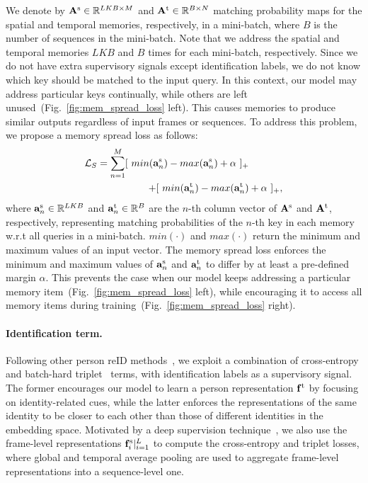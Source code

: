 \documentclass[10pt,twocolumn,letterpaper]{article}
\begin{document}
			We denote by $\mathbf{A}^{\text s} \in \mathbb{R}^{LKB \times M}$ and $\mathbf{A}^{\text t} \in \mathbb{R}^{B \times N}$ matching probability maps for the spatial and temporal memories, respectively, in a mini-batch, where $B$ is the number of sequences in the mini-batch. Note that we address the spatial and temporal memories $LKB$ and $B$ times for each mini-batch, respectively. Since we do not have extra supervisory signals except identification labels, we do not know which key should be matched to the input query. In this context, our model may address particular keys continually, while others are left unused~(Fig.~\ref{fig:mem_spread_loss} left). This causes memories to produce similar outputs regardless of input frames or sequences. To address this problem, we propose a memory spread loss as follows:
					\begin{equation} \label{eq:l_s}
						\begin{split}
							\mathcal{L}_{S} = \sum_{n=1}^{M} 
								[~ min (\mathbf{a}^{\text s}_n) 
								 - max (\mathbf{a}^{\text s}_n) + \alpha~]_+& \\
								+ [~ min (\mathbf{a}^{\text t}_n) 
								 - max (\mathbf{a}^{\text t}_n)& + \alpha~]_+,
						\end{split}
					\end{equation}
			where $\mathbf{a}^{\text s}_n \in \mathbb{R}^{LKB}$ and $\mathbf{a}^{\text t}_n \in \mathbb{R}^{B}$ are the $n$-th column vector of $\mathbf{A}^{\text s}$ and $\mathbf{A}^{\text t}$, respectively, representing matching probabilities of the $n$-th key in each memory w.r.t all queries in a mini-batch. $min(\cdot)$ and $max(\cdot)$ return the minimum and maximum values of an input vector. The memory spread loss enforces the minimum and maximum values of $\mathbf{a}^{\text s}_n$ and $\mathbf{a}^{\text t}_n$ to differ by at least a pre-defined margin $\alpha$. This prevents the case when our model keeps addressing a particular memory item~(Fig.~\ref{fig:mem_spread_loss} left), while encouraging it to access all memory items during training~(Fig.~\ref{fig:mem_spread_loss} right).
		
		\vspace{-0.4cm}
		\paragraph{Identification term.}
		
			Following other person reID methods~\cite{yan2020learning,zhang2020multi,hou2020temporal,chentemporal}, we exploit a combination of cross-entropy and batch-hard triplet~\cite{hermans2017defense} terms, with identification labels as a supervisory signal. The former encourages our model to learn a person representation $\mathbf{f}^{\text t}$ by focusing on identity-related cues, while the latter enforces the representations of the same identity to be closer to each other than those of different identities in the embedding space. Motivated by a deep supervision technique~\cite{lee2015deeply,wang2015training}, we also use the frame-level representations $\mathbf{f}^{\text s}_i |_{i=1}^L$ to compute the cross-entropy and triplet losses, where global and temporal average pooling are used to aggregate frame-level representations into a sequence-level one.
			
\end{document}
